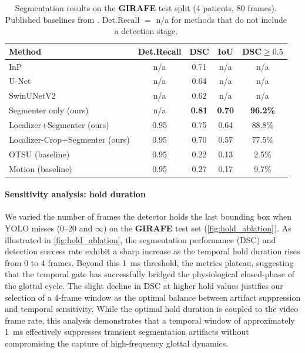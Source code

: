 \documentclass[preprint,12pt]{elsarticle}
\newcommand{\girafe}{\textbf{GIRAFE}}
\newcommand{\yolounet}{Localizer+Segmenter}
\newcommand{\yolocrop}{Localizer-Crop+Segmenter}
\begin{document}
\begin{table}[t]
\centering
\caption{Segmentation results on the \girafe{} test split (4 patients,
  80 frames). Published baselines from \protect\cite{andrade2025datainbrief}.
  Det.Recall $=$ n/a for methods that do not include a detection stage.}
\label{tab:girafe}
\small
\setlength{\tabcolsep}{4pt}
\begin{tabular}{lcccc}
\toprule
Method & Det.Recall & DSC & IoU & DSC${\geq}0.5$ \\
\midrule
InP~\cite{andrade2025datainbrief}       & n/a   & 0.71 & n/a   & n/a \\
U-Net~\cite{andrade2025datainbrief}     & n/a   & 0.64 & n/a   & n/a \\
SwinUNetV2~\cite{andrade2025datainbrief}& n/a   & 0.62 & n/a   & n/a \\
\midrule
Segmenter only (ours)                   & n/a   & \textbf{0.81} & \textbf{0.70} & \textbf{96.2\%} \\
\yolounet{} (ours)                      & 0.95 & 0.75 & 0.64 & 88.8\% \\
\yolocrop{} (ours)                      & 0.95 & 0.70 & 0.57 & 77.5\% \\
\midrule
OTSU (baseline)                         & 0.95 & 0.22 & 0.13 &  2.5\% \\
Motion (baseline)                       & 0.95 & 0.27 & 0.17 &  9.7\% \\
\bottomrule
\end{tabular}
\end{table}

\paragraph{Sensitivity analysis: hold duration}
We varied the number of frames the detector holds the last bounding box when
YOLO misses (0--20 and $\infty$) on the \girafe{} test set (\cref{fig:hold_ablation}).
As illustrated in \cref{fig:hold_ablation}, the segmentation performance
(DSC) and detection success rate exhibit a sharp increase as the temporal
hold duration rises from 0 to 4 frames.
Beyond this \SI{1}{ms} threshold, the metrics plateau, suggesting that the
temporal gate has successfully bridged the physiological closed-phase of
the glottal cycle.
The slight decline in DSC at higher hold values justifies our selection of
a 4-frame window as the optimal balance between artifact suppression and
temporal sensitivity.
While the optimal hold duration is coupled to the video frame rate, this
analysis demonstrates that a temporal window of approximately
\SI{1}{ms} effectively suppresses transient segmentation artifacts without
compromising the capture of high-frequency glottal dynamics.
\end{document}

